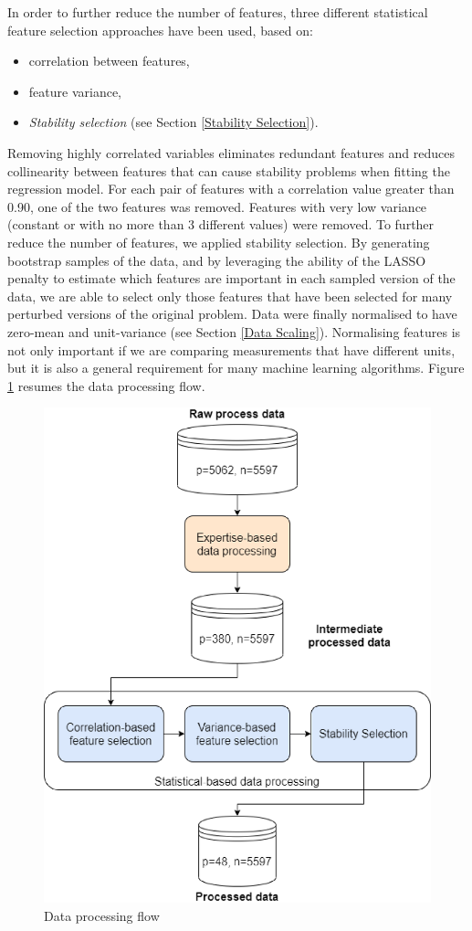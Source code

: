 In order to further reduce the number of features, three different statistical feature selection approaches have been used, based on:
\begin{itemize}
    \item correlation between features, 
    \item feature variance,
    \item \textit{Stability selection} (see Section \ref{Stability Selection}).
\end{itemize}
%
Removing highly correlated variables eliminates redundant features and reduces collinearity between features that can cause stability problems when fitting the regression model. For each pair of features with a correlation value greater than 0.90, one of the two features was removed. Features with very low variance (constant or with no more than 3 different values) were removed. To further reduce the number of features, we applied stability selection. By generating bootstrap samples of the data, and by leveraging the ability of the LASSO penalty to estimate which features are important in each sampled version of the data, we are able to select only those features that have been selected for many perturbed versions of the original problem. Data were finally normalised to have zero-mean and unit-variance (see Section \ref{Data Scaling}). Normalising features is not only important if we are comparing measurements that have different units, but it is also a general requirement for many machine learning algorithms. Figure \ref{fig:data_processing} resumes the data processing flow.
%
\begin{figure}
\centerline{\includegraphics[scale=0.7]{images/chapter_3/Data_processing.eps}}
\caption{Data processing flow}
\label{fig:data_processing}
\end{figure}
